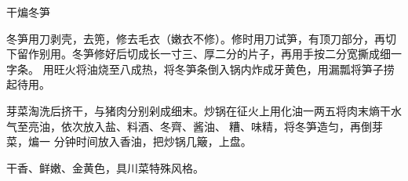 \begin{recipe}{干煸冬笋}

\ingredients


\preparation

\step 冬笋用刀剥壳，去篼，修去毛衣（嫩衣不修）。修时用刀试笋，有顶刀部分，再切
下留作别用。冬笋修好后切成长一寸三、厚二分的片子，再用手按二分宽撕成细一字条。
用旺火将油烧至八成热，将冬笋条倒入锅内炸成牙黄色，用漏瓢将笋子捞起待用。

\step 芽菜淘洗后挤干，与猪肉分别剁成细末。炒锅在征火上用化油一两五将肉末熵干水
气至亮油，依次放入盐、料酒、冬齊、酱油、𫃑糟、味精，将冬笋造匀，再倒芽菜，煸一
分钟时间放入香油，把炒锅几簸，上盘。

\features

干香、鲜嫩、金黄色，具川菜特殊风格。

\end{recipe}

